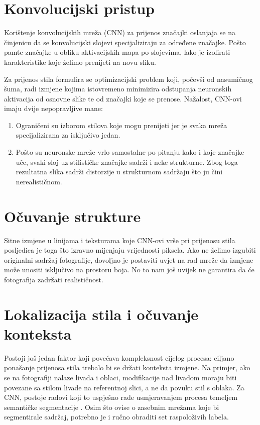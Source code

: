 \documentclass[lmodern, utf8, seminar]{fer}
\begin{document}
\section{Konvolucijski pristup}
Korištenje konvolucijskih mreža (CNN) za prijenos značajki oslanjaja se na činjenicu da se konvolucijski slojevi specijaliziraju za određene značajke. Pošto pamte značajke u obliku aktivacijskih mapa po slojevima, lako je izolirati karakteristike koje želimo prenijeti na novu sliku. 

Za prijenos stila formulira se optimizacijski problem koji, počevši od nasumičnog šuma, radi izmjene kojima istovremeno minimizira odstupanja neuronskih aktivacija od osnovne slike te od značajki koje se prenose. Nažalost, CNN-ovi imaju dvije nepopravljive mane:

\begin{enumerate} 
\item Ograničeni su izborom stilova koje mogu prenijeti jer je svaka mreža specijalizirana za isključivo jedan.
\item Pošto su neuronske mreže vrlo samostalne po pitanju kako i koje značajke uče, svaki sloj uz stilističke značajke sadrži i neke strukturne. Zbog toga rezultatna slika sadrži distorzije u strukturnom sadržaju što ju čini nerealističnom.
\end{enumerate}

\section{Očuvanje strukture}
Sitne izmjene u linijama i teksturama koje CNN-ovi vrše pri prijenosu stila posljedica je toga što izravno mijenjaju vrijednosti piksela. Ako ne želimo izgubiti originalni sadržaj fotografije, dovoljno je postaviti uvjet na rad mreže da izmjene može unositi isključivo na prostoru boja. No to nam još uvijek ne garantira da će fotografija zadržati realističnost.

\section{Lokalizacija stila i očuvanje konteksta} \cite{luan2017deep}
Postoji još jedan faktor koji povećava kompleksnost cijelog procesa: ciljano ponašanje prijenosa stila trebalo bi se držati konteksta izmjene. Na primjer, ako se na fotografiji nalaze livada i oblaci, modifikacije nad livadom moraju biti povezane sa stilom livade na referentnoj slici, a ne da povuku stil s oblaka. 
Za CNN, postoje radovi koji to uspješno rade usmjeravanjem procesa temeljem semantičke segmentacije \cite{luan2017deep}. Osim što ovise o zasebnim mrežama koje bi segmentirale sadržaj, potrebno je i ručno obraditi set raspoloživih labela.
\end{document}
